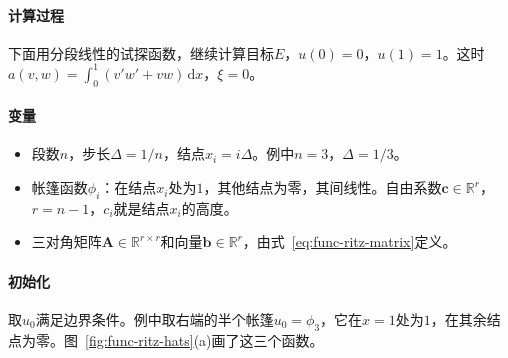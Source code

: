 \paragraph{计算过程}
下面用分段线性的试探函数，继续计算目标$E$，$u(0)=0$，$u(1)=1$。这时$a(v,w)=\int_0^1(v'w'+vw)\,\mathrm{d}x$，$\xi=0$。

\paragraph{变量}
\begin{itemize}
 \item 段数$n$，步长$\Delta=1/n$，结点$x_i=i\Delta$。例中$n=3$，$\Delta=1/3$。
 \item 帐篷函数$\phi_i$：在结点$x_i$处为$1$，其他结点为零，其间线性。自由系数$\bm{c}\in\mathbb{R}^{r}$，$r=n-1$，$c_i$就是结点$x_i$的高度。
 \item 三对角矩阵$\bm{A}\in\mathbb{R}^{r\times r}$和向量$\bm{b}\in\mathbb{R}^{r}$，由式~\eqref{eq:func-ritz-matrix}定义。
\end{itemize}

\paragraph{初始化}
取$u_0$满足边界条件。例中取右端的半个帐篷$u_0=\phi_3$，它在$x=1$处为$1$，在其余结点为零。图~\ref{fig:func-ritz-hats}(a)画了这三个函数。

